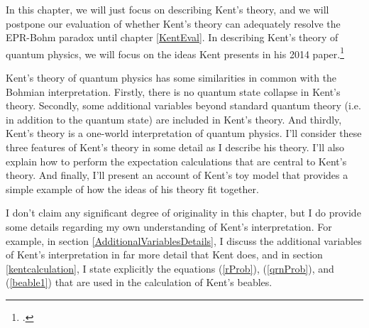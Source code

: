 In this chapter, we will just focus on describing Kent's theory, and we will postpone our evaluation of whether Kent's theory can adequately resolve the EPR-Bohm paradox until chapter \ref{KentEval}. In describing Kent's theory of quantum physics, we will focus on the ideas Kent presents in his 2014 paper.\footnote{\cite{Kent2014}.} 
 
Kent's theory of quantum physics has some similarities in common with the Bohmian interpretation. Firstly,  there is no quantum state collapse in Kent's theory. Secondly, some additional variables beyond standard quantum theory (i.e. in addition to the quantum state) are included in Kent's theory. And thirdly, Kent's theory is a one-world interpretation of quantum physics. I'll consider these three features of Kent's theory in some detail as I describe his theory. I'll also explain how to perform the expectation calculations that are central to Kent's theory. And finally, I'll present an account of Kent's toy model that provides a simple example of how the ideas of his theory fit together. 

I don't claim any significant degree of originality in this chapter, but I do provide some details regarding my own understanding of Kent's interpretation. For example, in section \ref{AdditionalVariablesDetails}, I discuss the additional variables of Kent's interpretation in far more detail that Kent does, and in section \ref{kentcalculation}, I state explicitly the equations (\ref{rProb}), (\ref{qrnProb}), and (\ref{beable1}) that are used in the calculation of Kent's beables.
